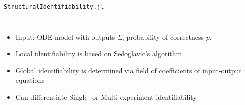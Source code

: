 \documentclass[12pt, aspectratio=169]{beamer}
\begin{document}
\begin{frame}{{\tt StructuralIdentifiability.jl}}
    \begin{columns}
        \begin{itemize}
            \item Input: ODE model with outputs \(\Sigma\), probability of correctness \(p\).
            \item Local identifiability is based on Sedoglavic's algorithm \cite{sedoglavic2002probabilistic}.
            \item Global identifiability is determined via field of coefficients of input-output equations
            \item Can differentiate Single- or Multi-experiment identifiability
        \end{itemize}
        \begin{center}
        \end{center}


    \end{columns}

\end{frame}
\end{document}
